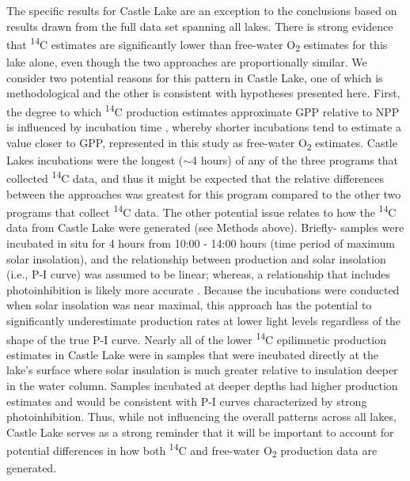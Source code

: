 \documentclass[12pt, oneside]{article}
\begin{document}
The specific results for Castle Lake are an exception to the conclusions based on results drawn from the full data set spanning all lakes. There is strong evidence that \textsuperscript{14}C estimates are significantly lower than free-water O\textsubscript{2} estimates for this lake alone, even though the two approaches are proportionally similar. We consider two potential reasons for this pattern in Castle Lake, one of which is methodological and the other is consistent with hypotheses presented here. First, the degree to which \textsuperscript{14}C production estimates approximate GPP relative to NPP is influenced by incubation time \citep{hall_measuring_2007}, whereby shorter incubations tend to estimate a value closer to GPP, represented in this study as free-water O\textsubscript{2} estimates. Castle Lakes incubations were the longest ($\sim$4 hours) of any of the three programs that collected \textsuperscript{14}C data, and thus it might be expected that the relative differences between the approaches was greatest for this program compared to the other two programs that collect \textsuperscript{14}C data. The other potential issue relates to how the \textsuperscript{14}C data from Castle Lake were generated (see Methods above). Briefly- samples were incubated in situ for 4 hours from 10:00 - 14:00 hours (time period of maximum solar insolation), and the relationship between production and solar insolation (i.e., P-I curve) was assumed to be linear; whereas, a relationship that includes photoinhibition is likely more accurate \citep{Huovinen_1999}. Because the incubations were conducted when solar insolation was near maximal, this approach has the potential to significantly underestimate production rates at lower light levels regardless of the shape of the true P-I curve. Nearly all of the lower \textsuperscript{14}C epilimnetic production estimates in Castle Lake were in samples that were incubated directly at the lake's surface where solar insulation is much greater relative to insulation deeper in the water column. Samples incubated at deeper depths had higher production estimates and would be consistent with P-I curves characterized by strong photoinhibition. Thus, while not influencing the overall patterns across all lakes, Castle Lake serves as a strong reminder that it will be important to account for potential differences in how both \textsuperscript{14}C and free-water O\textsubscript{2} production data are generated.
\end{document}
